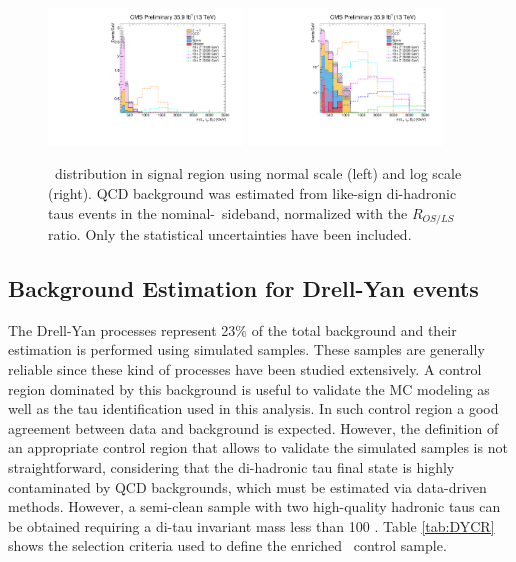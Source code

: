  \begin{figure}[H]
 \begin{center}
  \captionsetup[subfloat]{farskip=0pt,captionskip=0.0cm,labelformat=empty}
 \includegraphics[clip,width=0.46\textwidth]{figuras/Chapter5/QCD_Estimation/Result_SR.pdf}
  \includegraphics[clip,width=0.46\textwidth]{figuras/Chapter5/QCD_Estimation/Result_SR_log.pdf}
 \end{center}
 \caption{\mass~distribution in signal region using normal scale (left) and log scale (right). QCD 
 background was estimated from like-sign di-hadronic taus events in the 
 nominal-\MET~sideband, normalized with the $R_{OS/LS}$ ratio. Only the statistical uncertainties have been included.}
  \label{fig:SR_Result}	
 \end{figure}

\subsection{Background Estimation for Drell-Yan events}
\label{subsec:DY}

\noindent The Drell-Yan processes represent 23$\%$ of the total 
background and their estimation is performed 
using simulated samples. These samples are 
generally reliable since these kind of processes 
have been studied extensively. A control region 
dominated by this background is useful to 
validate the MC modeling as well as 
the tau identification used in this analysis. In such control 
region a good agreement between data and background is 
expected. However, the definition of an appropriate 
control region that allows to validate the simulated 
samples is not straightforward, considering 
that the di-hadronic tau final state is highly 
contaminated by QCD backgrounds, which must be 
estimated via data-driven methods. However,
a semi-clean sample with two high-quality 
hadronic taus can be obtained requiring a di-tau 
invariant mass less than 100 \GeV. Table \ref{tab:DYCR} shows 
the selection criteria used to define the  
enriched \Ztotauh~control sample.

